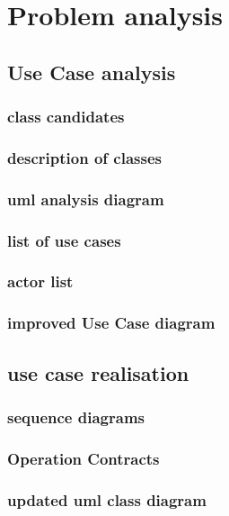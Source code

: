 \section{Problem analysis}

\subsection{Use Case analysis}

\subsubsection{class candidates}

\subsubsection{description of classes}

\subsubsection{uml analysis diagram}

\subsubsection{list of use cases}

\subsubsection{actor list}

\subsubsection{improved Use Case diagram}

\subsection{use case realisation}

\subsubsection{sequence diagrams}

\subsubsection{Operation Contracts}

\subsubsection{updated uml class diagram}

